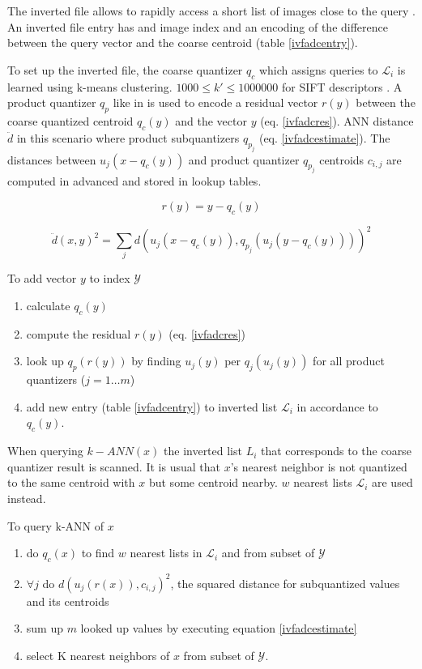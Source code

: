\documentclass[english,12pt,a4paper,pdftex,elec,utf8]{aaltothesis}
\begin{document}
The inverted file allows to rapidly access a short list of images close to the query \cite{Jegou2008}. An inverted file entry has and image index and an encoding of the difference between the query vector and the coarse centroid (table \ref{ivfadcentry}).

To set up the inverted file, the coarse quantizer $q_c$ which assigns queries to $\mathcal{L}_i$ is learned using k-means clustering. $1000 \leq k' \leq 1000000$ for SIFT descriptors \cite{Jegou2008}. A product quantizer $q_p$ like in \cite{Sivic2003} is used to encode a residual vector $r(y)$ between the coarse quantized centroid $q_c(y)$ and the vector $y$ (eq. \ref{ivfadcres}). ANN distance $\ddot{d}$ in this scenario where product subquantizers $q_{p_j}$ (eq. \ref{ivfadcestimate}). The distances between $u_j(x-q_c(y))$
and product quantizer $q_{p_j}$ centroids $c_{i,j}$ are computed in advanced and stored in lookup tables. \cite{Jegou2008}

\begin{equation}
  \label{ivfadcres}
r(y) = y - q_c(y)
\end{equation}

\begin{equation}
  \label{ivfadcestimate}
  \ddot{d}(x,y)^2 = \sum_jd\left(u_j(x-q_c(y)), q_{p_j}(u_j(y-q_c(y)))\right)^2
\end{equation}

To add vector $y$ to index $\mathcal{Y}$
\begin{enumerate}
\item calculate $q_c(y)$
\item compute the residual $r(y)$ (eq. \ref{ivfadcres})
\item look up $q_p(r(y))$ by finding $u_j(y)$ per $q_j(u_j(y))$ for all product quantizers ($j = 1 \ldots m$)
\item add new entry (table \ref{ivfadcentry}) to inverted list $\mathcal{L}_i$ in accordance to $q_c(y)$.
\end{enumerate}

When querying $k-ANN(x)$ the inverted list $L_i$ that corresponds to the coarse quantizer result is scanned. It is usual that $x$'s nearest neighbor is not quantized to the same centroid with $x$ but some centroid nearby. $w$ nearest lists $\mathcal{L}_i$ are used instead. \cite{Jegou2008}


To query k-ANN of $x$
\begin{enumerate}
\item do $q_c(x)$ to find $w$ nearest lists in $\mathcal{L}_i$ and from subset of $\mathcal{Y}$
\item $\forall j$ do $d(u_j(r(x)), c_{i,j})^2$, the squared distance for subquantized values and its centroids
\item sum up $m$ looked up values by executing equation \ref{ivfadcestimate}
  \item select K nearest neighbors of $x$ from subset of $\mathcal{Y}$.
\end{enumerate}
\cite{Jegou2008}
\end{document}
